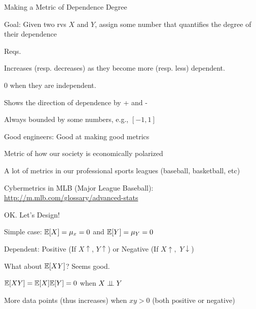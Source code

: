 \documentclass[fleqn,aspectratio=169]{beamer}
\begin{document}
\begin{frame}{Making a Metric of Dependence Degree}

\plitemsep 0.05in

\bci 

\item<1-> Goal: Given two rvs $X$ and $Y$, assign some number that quantifies the degree of their dependence

\item<2-> Reqs. 
\bce[a)]
\item<3-> Increases (resp. decreases) as they become more (resp. less) dependent.
\item<4-> 0 when they are independent.
\item<5-> Shows the direction of dependence by + and -
\item<6-> Always bounded by some numbers, e.g., $[-1,1]$
\ece

\item<7-> Good engineers: Good at making good metrics

\smallskip
\bci
\item Metric of how our society is economically polarized
\item A lot of metrics in our professional sports leagues (baseball, basketball, etc)
\item Cybermetrics in MLB (Major League Baseball): \url{http://m.mlb.com/glossary/advanced-stats}
\eci

\eci

\end{frame}

\begin{frame}{OK. Let's Design!}

\plitemsep 0.1in

\bci 

\item<1-> Simple case: $\mathbb{E}[ X ] =\mu_x = 0$ and $\mathbb{E}[ Y ]=\mu_Y = 0$
\item<2-> Dependent: Positive (If $X \uparrow$, $Y \uparrow$) or Negative (If $X \uparrow,$ $Y \downarrow$)

\item<3-> What about $\mathbb{E}[ XY ]$? Seems good. 

\bci
\item<4-> $\mathbb{E}[ XY ] = \mathbb{E}[ X ]\mathbb{E}[ Y ]=0$ when $X \perp \!\!\! \perp Y$
\item<5-> More data points (thus increases) when $xy >0$ (both positive or negative)
\eci

{
\centering
{}
}
{
\bigskip
{}
}

\eci

\end{frame}
\end{document}
